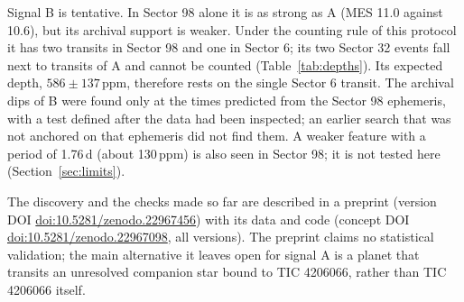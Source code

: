 Signal B is tentative. In Sector 98 alone it is as strong as A (MES 11.0 against 10.6), but its archival support is
weaker. Under the counting rule of this protocol it has two transits in Sector 98 and one in Sector 6; its two Sector
32 events fall next to transits of A and cannot be counted (Table~\ref{tab:depths}). Its expected depth, $586 \pm
137$\,ppm, therefore rests on the single Sector 6 transit. The archival dips of B were found only at the times
predicted from the Sector 98 ephemeris, with a test defined after the data had been inspected; an earlier search that
was not anchored on that ephemeris did not find them. A weaker feature with a period of 1.76\,d (about 130\,ppm) is
also seen in Sector 98; it is not tested here (Section~\ref{sec:limits}).

The discovery and the checks made so far are described in a preprint (version DOI \href{https://doi.org/10.5281/zenodo.22967456}{doi:10.5281/zenodo.22967456}) with
its data and code (concept DOI \href{https://doi.org/10.5281/zenodo.22967098}{doi:10.5281/zenodo.22967098}, all versions). The preprint claims no statistical
validation; the main alternative it leaves open for signal A is a planet that transits an unresolved companion star
bound to TIC 4206066, rather than TIC 4206066 itself.
